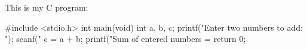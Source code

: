 \documentclass{article}
\begin{document}
This is my C program:

\begin{pygmented}[lang=c]
#include <stdio.h>
int main(void)
{
    int a, b, c;
    printf("Enter two numbers to add: ");
    scanf("%
    c = a + b;
    printf("Sum of entered numbers = %
    return 0;
}
\end{pygmented}
\end{document}
